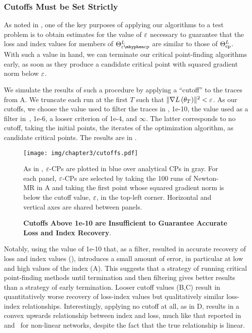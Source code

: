 \documentclass[../../thesis.tex]{subfiles}
\begin{document}
\subsubsection{Cutoffs Must be Set Strictly}%

As noted in ,
one of the key purposes of applying our algorithms
to a test problem is to obtain estimates for the value
of $\varepsilon$ necessary to guarantee that the loss and index values
for members of $\Theta^L_{\ecp}$
are similar to those of $\Theta^L_{\mathrm{cp}}$.
With such a value in hand,
we can terminate our critical point-finding algorithms early,
as soon as they produce a candidate critical point with
squared gradient norm below $\varepsilon$.

We simulate the results of such a procedure
by applying a \enquote{cutoff}
to the traces from A.
We truncate each run at the first $T$ such that
$\lVert\nabla L\left(\theta_T\right)\rVert^2 < \varepsilon$.
As our cutoffs,
we choose the value used to filter the traces in
, 1e-10,
the value used as a filter in~\cite{pennington2017}, 1e-6,
a looser criterion of 1e-4,
and $\infty$.
The latter corresponds to no cutoff,
taking the initial points,
the iterates of the optimization algorithm,
as candidate critical points.
The results are in .

\begin{figure}[h]
	\begin{center}
		\texttt{[image: img/chapter3/cutoffs.pdf]}
	\end{center}
	\caption{\textbf{Cutoffs Above 1e-10 are Insufficient to Guarantee
	Accurate Loss and Index Recovery}.}{%
	As in ,
	$\varepsilon$-CPs are plotted in blue
	over analytical CPs in gray.
	For each panel,
	$\varepsilon$-CPs are selected by taking
	the 100 runs of Newton-MR in A
	and taking the first point whose squared gradient norm is below
	the cutoff value, $\varepsilon$, in the top-left corner.
	Horizontal and vertical axes are shared between panels.
}
\end{figure}

Notably, using the value of 1e-10
that, as a filter,
resulted in accurate recovery of loss and index values
(),
introduces a small amount of error,
in particular at low and high values of the index
(A).
This suggests that
a strategy of running
critical point-finding methods until termination
and then filtering
gives better results than
a strategy of early termination.
Looser cutoff values
(B,C)
result in quantitatively worse
recovery of loss-index values
but qualitatively similar loss-index relationships.
Interestingly, applying no cutoff at all,
as in D,
results in a convex upwards relationship
between index and loss,
much like that reported in~\cite{dauphin2014} and~\cite{pennington2017}
for non-linear networks,
despite the fact that the true relationship is linear.
\end{document}
